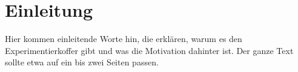 \chapter*{Einleitung}

Hier kommen einleitende Worte hin, die erklären, warum es den Experimentierkoffer gibt und was die Motivation dahinter ist.
Der ganze Text sollte etwa auf ein bis zwei Seiten passen.
